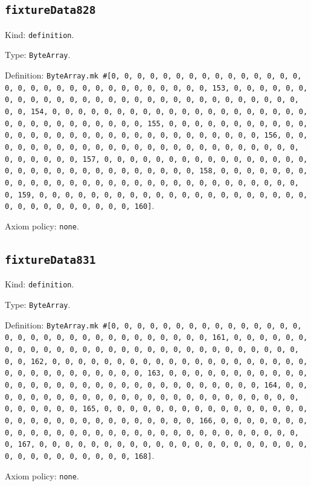 \documentclass[11pt]{article}
\begin{document}
\subsection*{\texttt{fixtureData828}}
\noindent Kind: \texttt{definition}.\par
\noindent Type: \texttt{ByteArray}.\par
\noindent Definition: \texttt{ByteArray.mk \#[0, 0, 0, 0, 0, 0, 0, 0, 0, 0, 0, 0, 0, 0, 0, 0, 0, 0, 0, 0, 0, 0, 0, 0, 0, 0, 0, 0, 0, 0, 0, 153, 0, 0, 0, 0, 0, 0, 0, 0, 0, 0, 0, 0, 0, 0, 0, 0, 0, 0, 0, 0, 0, 0, 0, 0, 0, 0, 0, 0, 0, 0, 0, 154, 0, 0, 0, 0, 0, 0, 0, 0, 0, 0, 0, 0, 0, 0, 0, 0, 0, 0, 0, 0, 0, 0, 0, 0, 0, 0, 0, 0, 0, 0, 0, 155, 0, 0, 0, 0, 0, 0, 0, 0, 0, 0, 0, 0, 0, 0, 0, 0, 0, 0, 0, 0, 0, 0, 0, 0, 0, 0, 0, 0, 0, 0, 0, 156, 0, 0, 0, 0, 0, 0, 0, 0, 0, 0, 0, 0, 0, 0, 0, 0, 0, 0, 0, 0, 0, 0, 0, 0, 0, 0, 0, 0, 0, 0, 0, 157, 0, 0, 0, 0, 0, 0, 0, 0, 0, 0, 0, 0, 0, 0, 0, 0, 0, 0, 0, 0, 0, 0, 0, 0, 0, 0, 0, 0, 0, 0, 0, 158, 0, 0, 0, 0, 0, 0, 0, 0, 0, 0, 0, 0, 0, 0, 0, 0, 0, 0, 0, 0, 0, 0, 0, 0, 0, 0, 0, 0, 0, 0, 0, 159, 0, 0, 0, 0, 0, 0, 0, 0, 0, 0, 0, 0, 0, 0, 0, 0, 0, 0, 0, 0, 0, 0, 0, 0, 0, 0, 0, 0, 0, 0, 0, 160]}.\par
\noindent Axiom policy: \texttt{none}.\par
\subsection*{\texttt{fixtureData831}}
\noindent Kind: \texttt{definition}.\par
\noindent Type: \texttt{ByteArray}.\par
\noindent Definition: \texttt{ByteArray.mk \#[0, 0, 0, 0, 0, 0, 0, 0, 0, 0, 0, 0, 0, 0, 0, 0, 0, 0, 0, 0, 0, 0, 0, 0, 0, 0, 0, 0, 0, 0, 0, 161, 0, 0, 0, 0, 0, 0, 0, 0, 0, 0, 0, 0, 0, 0, 0, 0, 0, 0, 0, 0, 0, 0, 0, 0, 0, 0, 0, 0, 0, 0, 0, 162, 0, 0, 0, 0, 0, 0, 0, 0, 0, 0, 0, 0, 0, 0, 0, 0, 0, 0, 0, 0, 0, 0, 0, 0, 0, 0, 0, 0, 0, 0, 0, 163, 0, 0, 0, 0, 0, 0, 0, 0, 0, 0, 0, 0, 0, 0, 0, 0, 0, 0, 0, 0, 0, 0, 0, 0, 0, 0, 0, 0, 0, 0, 0, 164, 0, 0, 0, 0, 0, 0, 0, 0, 0, 0, 0, 0, 0, 0, 0, 0, 0, 0, 0, 0, 0, 0, 0, 0, 0, 0, 0, 0, 0, 0, 0, 165, 0, 0, 0, 0, 0, 0, 0, 0, 0, 0, 0, 0, 0, 0, 0, 0, 0, 0, 0, 0, 0, 0, 0, 0, 0, 0, 0, 0, 0, 0, 0, 166, 0, 0, 0, 0, 0, 0, 0, 0, 0, 0, 0, 0, 0, 0, 0, 0, 0, 0, 0, 0, 0, 0, 0, 0, 0, 0, 0, 0, 0, 0, 0, 167, 0, 0, 0, 0, 0, 0, 0, 0, 0, 0, 0, 0, 0, 0, 0, 0, 0, 0, 0, 0, 0, 0, 0, 0, 0, 0, 0, 0, 0, 0, 0, 168]}.\par
\noindent Axiom policy: \texttt{none}.\par
\end{document}
